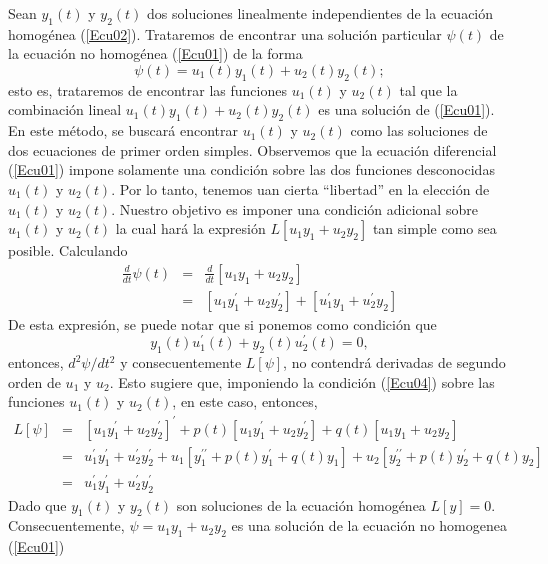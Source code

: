 \documentclass[12pt]{article}
\def\SOH#1{%
#1^{\prime\prime}+p(t)#1^{\prime}+q(t)#1
}
\def\DotPro#1#2#3#4{
#1#2+#3#4
}
\begin{document}
Sean $y_{1}(t)$ y $y_{2}(t)$ dos soluciones linealmente independientes de la ecuación homogénea 
(\ref{Ecu02}). Trataremos de encontrar una solución particular $\psi(t)$ de la ecuación no 
homogénea (\ref{Ecu01}) de la forma
\begin{equation}
\psi(t)=u_{1}(t)y_{1}(t)+u_{2}(t)y_{2}(t);
\label{Ecu03}
\end{equation}
esto es, trataremos de encontrar las funciones $u_{1}(t)$ y $u_{2}(t)$ tal que la combinación 
lineal $u_{1}(t)y_{1}(t)+u_{2}(t)y_{2}(t)$ es una solución de (\ref{Ecu01}). En este método, se 
buscará encontrar $u_{1}(t)$ y $u_{2}(t)$ como las soluciones de dos ecuaciones de primer orden 
simples. Observemos que la ecuación diferencial (\ref{Ecu01}) impone solamente una condición 
sobre las dos funciones desconocidas $u_{1}(t)$ y $u_{2}(t)$. Por lo tanto, tenemos uan cierta 
``libertad'' en la elección de $u_{1}(t)$ y $u_{2}(t)$. Nuestro objetivo es imponer una condición 
adicional sobre $u_{1}(t)$ y $u_{2}(t)$ la cual hará la expresión $L[u_{1}y_{1}+u_{2}y_{2}]$ tan 
simple como sea posible. Calculando
\begin{eqnarray}
\frac{d}{dt}\psi(t)&=&\frac{d}{dt}[u_{1}y_{1}+u_{2}y_{2}]\nonumber\\
&=&[u_{1}y_{1}^{\prime}+u_{2}y_{2}^{\prime}]+[u_{1}^{\prime}y_{1}+u_{2}^{\prime}y_{2}]\nonumber
\end{eqnarray}
De esta expresión, se puede notar que si ponemos como condición que
\begin{equation}
y_{1}(t)u_{1}^{\prime}(t)+y_{2}(t)u_{2}^{\prime}(t)=0,
\label{Ecu04}
\end{equation}
entonces, $d^{2}\psi/dt^{2}$ y consecuentemente $L[\psi]$, no contendrá derivadas de segundo orden 
de $u_{1}$ y $u_{2}$. Esto sugiere que, imponiendo la condición (\ref{Ecu04}) sobre las funciones 
$u_{1}(t)$ y $u_{2}(t)$, en este caso, entonces,
\begin{eqnarray}
L[\psi]&=&[u_{1}y_{1}^{\prime}+u_{2}y_{2}^{\prime}]^{\prime}+p(t)[u_{1}y_{1}^{\prime}+u_{2}y_{2}^{\prime}]+
q(t)[u_{1}y_{1}+u_{2}y_{2}]\nonumber\\
&=&u_{1}^{\prime}y_{1}^{\prime}+u_{2}^{\prime}y_{2}^{\prime}+
u_{1}[\SOH{y_{1}}]+u_{2}[\SOH{y_{2}}]\nonumber\\
&=&u_{1}^{\prime}y_{1}^{\prime}+u_{2}^{\prime}y_{2}^{\prime}\nonumber
\end{eqnarray}
Dado que $y_{1}(t)$ y $y_{2}(t)$ son soluciones de la ecuación homogénea $L[y]=0$. Consecuentemente, 
$\psi=\DotPro{u_{1}}{y_{1}}{u_{2}}{y_{2}}$ es una solución de la ecuación no homogenea (\ref{Ecu01}) 
\end{document}
